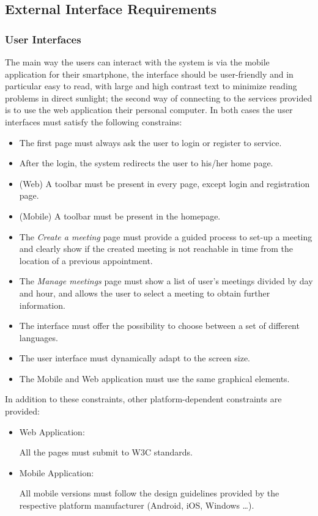 \subsection{External Interface Requirements}
\subsubsection{User Interfaces}
The main way the users can interact with the system is via the mobile application for their smartphone, the interface should be user-friendly and in particular easy to read, with large and high contrast text to minimize reading problems in direct sunlight; the second way of connecting to the services provided is to use the web application their personal computer.
In both cases the user interfaces must satisfy the following constrains:
\begin{itemize}
	\item The first page must always ask the user to login or register to service.
	\item After the login, the system redirects the user to his/her home page.
	\item (Web) A toolbar must be present in every page, except login and registration page.
	\item (Mobile) A toolbar must be present in the homepage.
	\item The \emph{Create a meeting} page must provide a guided process to set-up a meeting and clearly show if the created meeting is not reachable in time from the location of a previous appointment.
	\item The \emph{Manage meetings} page must show a list of user's meetings divided by day and hour, and allows the user to select a meeting to obtain further information.
	\item The interface must offer the possibility to choose between a set of different languages.
	\item The user interface must dynamically adapt to the screen size.
	\item The Mobile and Web application must use the same graphical elements.
\end{itemize}
In addition to these constraints, other platform-dependent constraints are provided:
\begin{itemize}
	\item Web Application:\par
		All the pages must submit to W3C standards.
	\item Mobile Application:\par
		All mobile versions must follow the design guidelines provided by the respective platform manufacturer (Android, iOS, Windows \dots).
\end{itemize}
